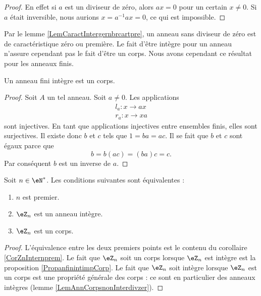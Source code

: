 \begin{proof}
    En effet si \( a\) est un diviseur de zéro, alors \( ax=0\) pour un certain \( x\neq 0\). Si \( a\) était inversible, nous aurions \( x=a^{-1}ax=0\), ce qui est impossible.
\end{proof}

Par le lemme \ref{LemCaractIntergernbrcartpre}, un anneau sans diviseur de zéro est de caractéristique zéro ou première. Le fait d'être intègre pour un anneau n'assure cependant pas le fait d'être un corps. Nous avons cependant ce résultat pour les anneaux finis.

\begin{proposition}     \label{PropanfinintimpCorp}
    Un anneau fini intègre est un corps.
\end{proposition}

\begin{proof}
    Soit \( A\) un tel anneau. Soit \( a\neq 0\). Les applications 
    \begin{subequations}
        \begin{align}
            l_a\colon x\to ax\\
            r_a\colon x\to xa
        \end{align}
    \end{subequations}
    sont injectives. En tant que applications injectives entre ensembles finis, elles sont surjectives. Il existe donc \( b\) et \( c\) tels que \( 1=ba=ac\). Il se fait que \( b\) et \( c\) sont égaux parce que
    \begin{equation}
        b=b(ac)=(ba)c=c.
    \end{equation}
    Par conséquent \( b\) est un inverse de \( a\).
\end{proof}

\begin{proposition}     \label{PropzhFgNJ}
    Soit \( n\in\eN^*\). Les conditions suivantes sont équivalentes :
    \begin{enumerate}
        \item
            \( n\) est premier.
        \item
            \( \eZ_n\) est un anneau intègre.
        \item
            \( \eZ_n\) est un corps.
    \end{enumerate}
\end{proposition}

\begin{proof}
    L'équivalence entre les deux premiers points est le contenu du corollaire \ref{CorZnInternprem}. Le fait que \( \eZ_n\) soit un corps lorsque \( \eZ_n\) est intègre est la proposition \ref{PropanfinintimpCorp}. Le fait que \( \eZ_n\) soit intègre lorsque \( \eZ_n\) est un corps est une propriété générale des corps : ce sont en particulier des anneaux intègres (lemme \ref{LemAnnCorpsnonInterdivzer}).
\end{proof}

